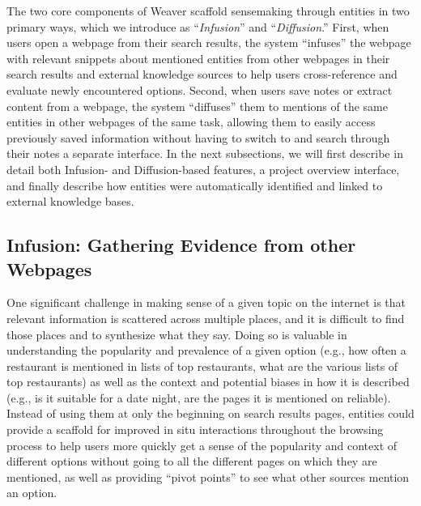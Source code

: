 The two core components of Weaver scaffold sensemaking through entities in two primary ways, which we introduce as ``\emph{Infusion}'' and ``\emph{Diffusion}.'' First, when users open a webpage from their search results, the system ``infuses'' the webpage with relevant snippets about mentioned entities from other webpages in their search results and external knowledge sources to help users cross-reference and evaluate newly encountered options. Second, when users save notes or extract content from a webpage, the system ``diffuses'' them to mentions of the same entities in other webpages of the same task, allowing them to easily access previously saved information without having to switch to and search through their notes a separate interface. In the next subsections, we will first describe in detail both Infusion- and Diffusion-based features, a project overview interface, and finally describe how entities were automatically identified and linked to external knowledge bases.

\subsection{Infusion: Gathering Evidence from other Webpages}

One significant challenge in making sense of a given topic on the internet is that relevant information is scattered across multiple places, and it is difficult to find those places and to synthesize what they say. Doing so is valuable in understanding the popularity and prevalence of a given option (e.g., how often a restaurant is mentioned in lists of top restaurants, what are the various lists of top restaurants) as well as the context and potential biases in how it is described (e.g., is it suitable for a date night, are the pages it is mentioned on reliable). Instead of using them at only the beginning on search results pages, entities could provide a scaffold for improved in situ interactions throughout the browsing process to help users more quickly get a sense of the popularity and context of different options without going to all the different pages on which they are mentioned, as well as providing ``pivot points'' to see what other sources mention an option.

